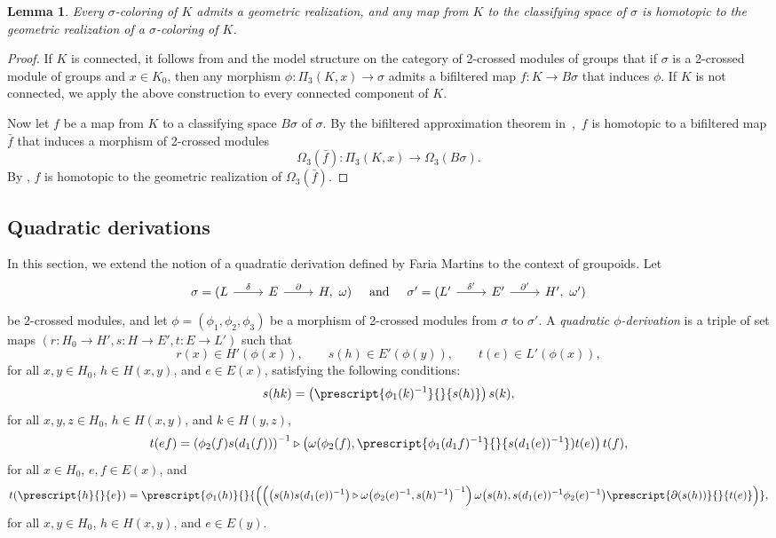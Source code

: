 \documentclass[a4paper, oneside]{amsart}
\numberwithin{equation}{subsection}
\theoremstyle{referencedlemma}
\theoremstyle{plain} %
\newtheorem{lem}[equation]{Lemma}
\theoremstyle{remark}
\begin{document}
\begin{lem}\label{Lemma Realizability} 
Every $\sigma$-coloring of $K$ admits a geometric realization, and any map from $K$ to the classifying space of $\sigma$ is homotopic to the geometric realization of a $\sigma$-coloring of $K$. 
\end{lem}
\begin{proof}
If $K$ is connected, it follows from \cite{martins_fundamental_2011} and the model structure on the category of 2-crossed modules of groups that if $\sigma$ is a 2-crossed module of groups and $x\in K_0$, then any morphism $\phi\colon \Pi_3(K, x) \to \sigma$ admits a bifiltered map $f\colon K \to B\sigma$ that induces $\phi$. If $K$ is not connected, we apply the above construction to every connected component of $K$.  

Now let $f$ be a map from $K$ to a classifying space $B\sigma$ of $\sigma$.  By the bifiltered approximation theorem in~\cite{martins_fundamental_2011},~$f$ is homotopic to a bifiltered map $\bar{f}$ that induces a morphism of 2-crossed modules
$$
\Omega_3(\bar{f})\colon \Pi_3(K,x) \to \Omega_3(B\sigma).
$$
By \cite[Lemma 3.16]{martins_fundamental_2011}, $f$ is homotopic to the geometric realization of $\Omega_3(\bar{f})$. 
\end{proof}


\subsection{Quadratic derivations}


In this section, we extend the notion of a quadratic derivation defined by Faria Martins \cite{martins_fundamental_2011} to the context of groupoids.  Let
$$
\begin{tikzcd}\sigma = (L\arrow[r, "\delta"] & E\arrow[r, "\partial"] & H, \ \omega)\end{tikzcd} \quad\text{and} \quad \begin{tikzcd}\sigma' = (L'\arrow[r, "\delta'"] & E'\arrow[r, "\partial'"] & H', \ \omega')\end{tikzcd}
$$
be 2-crossed modules, and let $\phi = (\phi_1, \phi_2, \phi_3)$ be a morphism of 2-crossed modules from $\sigma$ to $\sigma'$.  A \emph{quadratic $\phi$-derivation} is a triple of set maps $(r\colon H_0\to H', s\colon H\to E', t\colon E\to L')$ such that 
$$
r(x) \in H'(\phi(x)),\quad\quad s(h) \in E'(\phi(y)),\quad\quad t(e) \in L'(\phi(x)),
$$
for all $x,y\in H_0$, $h\in H(x,y)$, and $e\in E(x)$, satisfying the following conditions:
$$
s(hk) = \left(\prescript{\phi_1(k)^{-1}}{}{s(h)}\right)s(k),
$$
for all $x, y, z\in H_0$, $h\in H(x,y)$, and $k \in H(y,z)$,  
$$
t(ef) = \left(\phi_2(f)s(d_1 (f))\right)^{-1}\triangleright \left(\omega(\phi_2 (f), \prescript{\phi_1(d_1f)^{-1}}{}{s(d_1(e))^{-1}}) t(e)\right)t(f),
$$
for all $x\in H_0$, $e,f\in E(x)$, and
$$
t(\prescript{h}{}{e}) = \prescript{\phi_1(h)}{}{\left(\left(\left(s(h)s(d_1(e))^{-1}\right)\triangleright \omega\big(\phi_2(e)^{-1}, s(h)^{-1}\big)^{-1}\right) \omega\big(s(h), s(d_1(e))^{-1}\phi_2(e)^{-1}\big)\prescript{\partial (s(h))}{}{t(e)} \right)},
$$
for all $x,y \in H_0$, $h\in H(x,y)$, and $e\in E(y)$.
\end{document}
